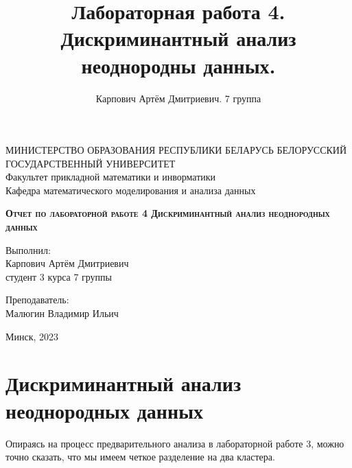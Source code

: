 \documentclass[11pt]{article}
\title{Лабораторная работа 4. \\ Дискриминантный анализ неоднородны данных.}
\author{Карпович Артём Дмитриевич. 7 группа}
\begin{document}
    
    \begin{titlepage}
    \newpage
    
    \begin{center}
    МИНИСТЕРСТВО ОБРАЗОВАНИЯ РЕСПУБЛИКИ БЕЛАРУСЬ БЕЛОРУССКИЙ ГОСУДАРСТВЕННЫЙ УНИВЕРСИТЕТ \\
    Факультет прикладной математики и инворматики \\ Кафедра математического моделирования и анализа данных 
    \end{center}
    
    \vspace{8em}
    
    \vspace{2em}
    
    \begin{center}
    \textsc{\textbf{Отчет по лабораторной работе 4 \linebreak Дискриминантный анализ неоднородных данных}}
    \end{center}
    
    \vspace{6em}
    
    \begin{flushright}
        Выполнил:\\
        Карпович Артём Дмитриевич\\
        студент 3 курса 7 группы
    \end{flushright}
    
    \begin{flushright}
        Преподаватель:\\
        Малюгин Владимир Ильич
    \end{flushright}
    
    \vspace{\fill}
    
    \begin{center}
    Минск, 2023
    \end{center}
    
    \end{titlepage}

    \section*{Дискриминантный анализ неоднородных данных}

    Опираясь на процесс предварительного анализа в лабораторной работе 3,
можно точно сказать, что мы имеем четкое разделение на два кластера.
\end{document}
